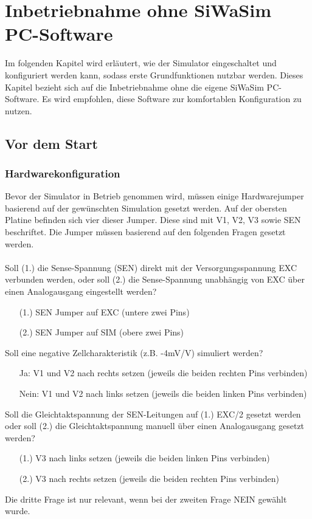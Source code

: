 \documentclass[12pt, a4paper]{report}
\begin{document}
\chapter{Inbetriebnahme ohne SiWaSim PC-Software}
Im folgenden Kapitel wird erläutert, wie der Simulator eingeschaltet und konfiguriert werden kann, sodass erste Grundfunktionen nutzbar werden. Dieses Kapitel bezieht sich auf die Inbetriebnahme ohne die eigene SiWaSim PC-Software. Es wird empfohlen, diese Software zur komfortablen Konfiguration zu nutzen.
\section{Vor dem Start}
\subsection{Hardwarekonfiguration}
Bevor der Simulator in Betrieb genommen wird, müssen einige Hardwarejumper basierend auf der gewünschten Simulation gesetzt werden. 
Auf der obersten Platine befinden sich vier dieser Jumper. Diese sind mit V1, V2, V3 sowie SEN beschriftet. Die Jumper müssen basierend auf den folgenden Fragen gesetzt werden.\\\\
Soll (1.) die Sense-Spannung (SEN) direkt mit der Versorgungsspannung EXC verbunden werden, oder soll (2.) die Sense-Spannung unabhängig von EXC über einen Analogausgang eingestellt werden?
\begin{itemize}
\item[(1.)] SEN Jumper auf EXC (untere zwei Pins) 
\item[(2.)] SEN Jumper auf SIM (obere zwei Pins) 
\end{itemize}
Soll eine negative Zellcharakteristik (z.B. -4mV/V) simuliert werden?
\begin{itemize}
\item[Ja:] V1 und V2 nach rechts setzen (jeweils die beiden rechten Pins verbinden)
\item[Nein:] V1 und V2 nach links setzen (jeweils die beiden linken Pins verbinden)
\end{itemize}
Soll die Gleichtaktspannung der SEN-Leitungen auf (1.) EXC/2 gesetzt werden oder soll (2.) die Gleichtaktspannung manuell über einen Analogausgang gesetzt werden?

\begin{itemize}
\item[(1.)] V3 nach links setzen (jeweils die beiden linken Pins verbinden)
\item[(2.)] V3 nach rechts setzen (jeweils die beiden rechten Pins verbinden) 
\end{itemize}
Die dritte Frage ist nur relevant, wenn bei der zweiten Frage NEIN gewählt wurde.
\end{document}
